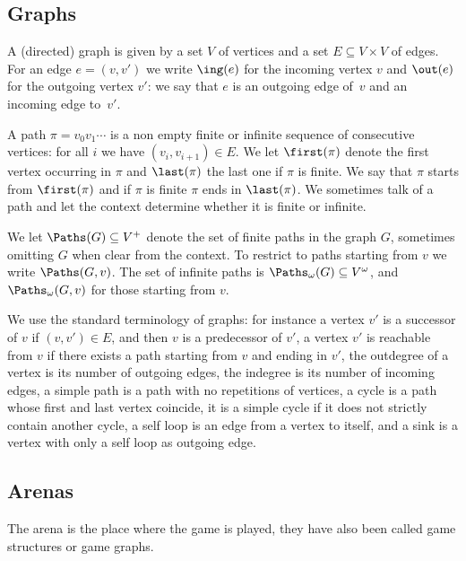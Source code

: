 \documentclass[letterpaper,10pt,english]{sphinxmanual}
\begin{document}
\subsection{Graphs}
\label{\detokenize{1_Introduction/simple:graphs}}\label{\detokenize{1_Introduction/simple:subsec-graphs}}
A (directed) graph is given by a
set \(V\) of vertices and a set \(E \subseteq V \times V\) of edges. For an
edge \(e = (v,v')\) we write \(\ing(e)\) for the incoming
vertex \(v\) and \(\out(e)\) for the outgoing vertex \(v'\): we
say that \(e\) is an outgoing edge of \(v\) and an incoming
edge to \(v'\).

A path \(\pi = v_0 v_1 \cdots\) is a non empty finite or infinite
sequence of consecutive vertices: for all \(i\) we have
\((v_i,v_{i+1}) \in E\). We let \(\first(\pi)\) denote the first vertex
occurring in \(\pi\) and \(\last(\pi)\) the last one if \(\pi\) is finite. We
say that \(\pi\) starts from \(\first(\pi)\) and if \(\pi\) is finite
\(\pi\) ends in \(\last(\pi)\). We sometimes talk of a path and let
the context determine whether it is finite or infinite.

We let \(\Paths(G) \subseteq V^+\) denote the set of finite paths in the
graph \(G\), sometimes omitting \(G\) when clear from the context. To
restrict to paths starting from \(v\) we write \(\Paths(G,v)\). The set of
infinite paths is \(\Paths_\omega(G) \subseteq V^\omega\), and
\(\Paths_\omega(G,v)\) for those starting from \(v\).

We use the standard terminology of graphs: for instance a vertex \(v'\) is
a successor of \(v\) if \((v,v') \in E\), and then \(v\) is a
predecessor of \(v'\), a vertex \(v'\) is reachable from \(v\)
if there exists a path starting from \(v\) and ending in \(v'\), the
outdegree of a vertex is its number of outgoing edges, the
indegree is its number of incoming edges, a simple path
is a path with no repetitions of vertices, a cycle is a path
whose first and last vertex coincide, it is a simple cycle if it
does not strictly contain another cycle, a self loop is an edge
from a vertex to itself, and a sink is a vertex with only a self
loop as outgoing edge.


\subsection{Arenas}
\label{\detokenize{1_Introduction/simple:arenas}}\label{\detokenize{1_Introduction/simple:subsec-arenas}}
The arena is the place where the game is played, they have also
been called game structures or game graphs.
\end{document}
